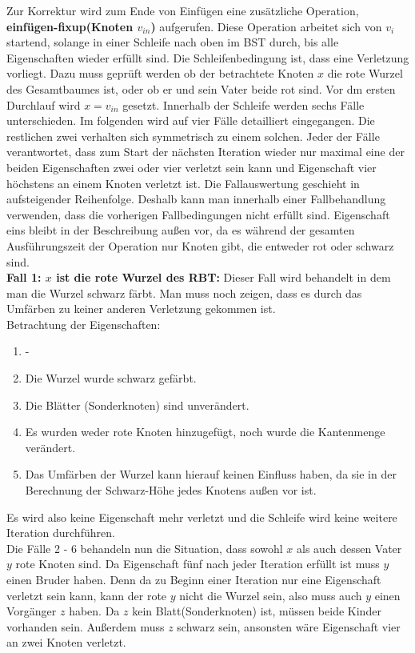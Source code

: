 \documentclass[a4paper,12pt]{article}
\begin{document}
 \noindent Zur Korrektur wird zum Ende von Einfügen eine zusätzliche Operation, \textbf{einfügen-fixup(Knoten $v_{in}$)} aufgerufen. Diese Operation arbeitet sich von $v_i$ startend, solange in einer Schleife nach oben im BST durch, bis alle Eigenschaften wieder erfüllt sind. Die Schleifenbedingung ist, dass eine Verletzung vorliegt. Dazu muss geprüft werden ob der betrachtete Knoten $x$ die rote Wurzel des Gesamtbaumes ist, oder ob er und sein Vater beide rot sind. Vor dm ersten Durchlauf wird $x = v_{in}$ gesetzt. Innerhalb der Schleife werden sechs Fälle unterschieden. Im folgenden wird auf vier Fälle detailliert eingegangen. Die restlichen zwei verhalten sich symmetrisch zu einem solchen. Jeder der Fälle verantwortet, dass zum Start der nächsten Iteration wieder nur maximal eine der beiden Eigenschaften zwei oder vier verletzt sein kann und Eigenschaft vier höchstens an einem Knoten verletzt ist. Die Fallauswertung geschieht in aufsteigender Reihenfolge. Deshalb kann man innerhalb einer Fallbehandlung verwenden, dass die vorherigen Fallbedingungen nicht erfüllt sind. Eigenschaft eins bleibt in der Beschreibung außen vor, da es während der gesamten Ausführungszeit der Operation nur Knoten gibt, die entweder rot oder schwarz sind. \\
 
\noindent\textbf{Fall 1: $x$ ist die rote Wurzel des RBT: }
Dieser Fall wird behandelt in dem man die Wurzel schwarz färbt. Man muss noch zeigen, dass es durch das Umfärben zu keiner anderen Verletzung gekommen ist.\\

Betrachtung der Eigenschaften:
\begin{enumerate}
	\item -
	\item Die Wurzel wurde schwarz gefärbt.
	\item Die Blätter (Sonderknoten) sind unverändert.
	\item Es wurden weder rote Knoten hinzugefügt, noch wurde die Kantenmenge verändert. 
	\item Das Umfärben der Wurzel kann hierauf keinen Einfluss haben, da sie in der Berechnung der Schwarz-Höhe jedes Knotens außen vor ist.
\end{enumerate}  

\noindent Es wird also keine Eigenschaft mehr verletzt und die Schleife wird keine weitere Iteration durchführen.\\
 Die Fälle 2 - 6 behandeln nun die Situation, dass sowohl $x$ als auch dessen Vater $y$ rote Knoten sind. Da Eigenschaft fünf nach jeder Iteration erfüllt ist muss $y$ einen Bruder haben. Denn da zu Beginn einer Iteration nur eine Eigenschaft verletzt sein kann, kann der rote $y$ nicht die Wurzel sein, also muss auch $y$ einen Vorgänger $z$ haben. Da $z$ kein Blatt(Sonderknoten) ist, müssen beide Kinder vorhanden sein. Außerdem muss $z$ schwarz sein, ansonsten wäre Eigenschaft vier an zwei Knoten verletzt.\\
 
\end{document}
